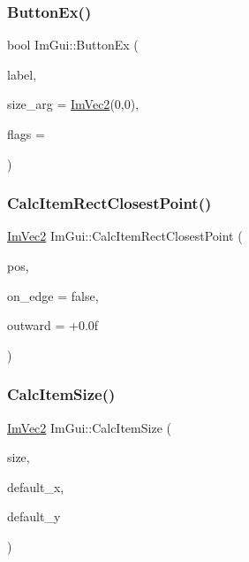 \mbox{\label{namespace_im_gui_ae479220c66b039874c6e4c9e9b22849f}} 
\subsubsection{\texorpdfstring{Button\+Ex()}{ButtonEx()}}
{\footnotesize\ttfamily bool Im\+Gui\+::\+Button\+Ex (\begin{DoxyParamCaption}\item[{const char $\ast$}]{label,  }\item[{const \mbox{\hyperlink{struct_im_vec2}{Im\+Vec2}} \&}]{size\+\_\+arg = {\ttfamily \mbox{\hyperlink{struct_im_vec2}{Im\+Vec2}}(0,0)},  }\item[{\mbox{\hyperlink{imgui__internal_8h_a990fae518aa1d95f571ee40989de4c22}{Im\+Gui\+Button\+Flags}}}]{flags = {} }\end{DoxyParamCaption})}

\mbox{\label{namespace_im_gui_a6c66a7acf7e6eef639b5f1211d8332a3}} 
\subsubsection{\texorpdfstring{Calc\+Item\+Rect\+Closest\+Point()}{CalcItemRectClosestPoint()}}
{\footnotesize\ttfamily \mbox{\hyperlink{struct_im_vec2}{Im\+Vec2}} Im\+Gui\+::\+Calc\+Item\+Rect\+Closest\+Point (\begin{DoxyParamCaption}\item[{const \mbox{\hyperlink{struct_im_vec2}{Im\+Vec2}} \&}]{pos,  }\item[{bool}]{on\+\_\+edge = {\ttfamily false},  }\item[{float}]{outward = {\ttfamily +0.0f} }\end{DoxyParamCaption})}

\mbox{\label{namespace_im_gui_a3c1505e785f9571ed82500692a727c5f}} 
\subsubsection{\texorpdfstring{Calc\+Item\+Size()}{CalcItemSize()}}
{\footnotesize\ttfamily \mbox{\hyperlink{struct_im_vec2}{Im\+Vec2}} Im\+Gui\+::\+Calc\+Item\+Size (\begin{DoxyParamCaption}\item[{\mbox{\hyperlink{struct_im_vec2}{Im\+Vec2}}}]{size,  }\item[{float}]{default\+\_\+x,  }\item[{float}]{default\+\_\+y }\end{DoxyParamCaption})}

